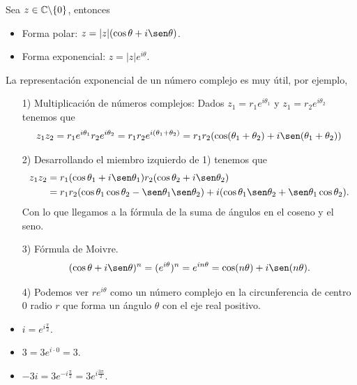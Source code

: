 \begin{defi}
    Sea $z \in \mathbb{C} \backslash \{0\}$, entonces
    \begin{itemize}
        \item Forma polar: $z = |z|(\cos\theta + i\sen\theta)$.
        \item Forma exponencial: $z = |z|e^{i\theta}$.
    \end{itemize}
\end{defi}
La representación exponencial de un número complejo es muy útil, por ejemplo,
\begin{enumerate}
    \item[1)] Multiplicación de números complejos: Dados $z_1 = r_1e^{i\theta_1}$ y $z_1 = r_2e^{i\theta_2}$ tenemos que
          \begin{align*}
              z_1z_2 = r_1e^{i\theta_1}r_2e^{i\theta_2} = r_1r_2e^{i(\theta_1 + \theta_2)} = r_1r_2(\cos(\theta_1 + \theta_2) + i\sen(\theta_1 + \theta_2))
          \end{align*}
    \item[2)] Desarrollando el miembro izquierdo de 1) tenemos que
          \begin{align*}
              z_1z_2 & = r_1(\cos\theta_1 + i\sen\theta_1)r_2(\cos\theta_2 + i\sen\theta_2)                                                    \\
                     & = r_1r_2(\cos\theta_1\cos\theta_2 - \sen\theta_1\sen\theta_2) + i(\cos\theta_1\sen\theta_2 + \sen\theta_1\cos\theta_2).
          \end{align*}
          Con lo que llegamos a la fórmula de la suma de ángulos en el coseno y el seno.
    \item[3)] Fórmula de Moivre.
          \begin{align*}
              (\cos\theta + i\sen\theta)^n = (e^{i\theta})^n = e^{in\theta} = \cos(n\theta) +i\sen(n\theta).
          \end{align*}
    \item[4)] Podemos ver $re^{i\theta}$ como un número complejo en la circunferencia de centro 0 radio $r$ que forma un ángulo $\theta$ con el eje real positivo.
\end{enumerate}

\begin{ejemplo}
    \begin{itemize}
        \item $i = e^{i\frac{\pi}{2}}$.
        \item $3 = 3e^{i\cdot 0} = 3$.
        \item $-3i = 3e^{-i\frac{\pi}{2}} = 3e^{i\frac{3\pi}{2}}$.
    \end{itemize}
\end{ejemplo}

